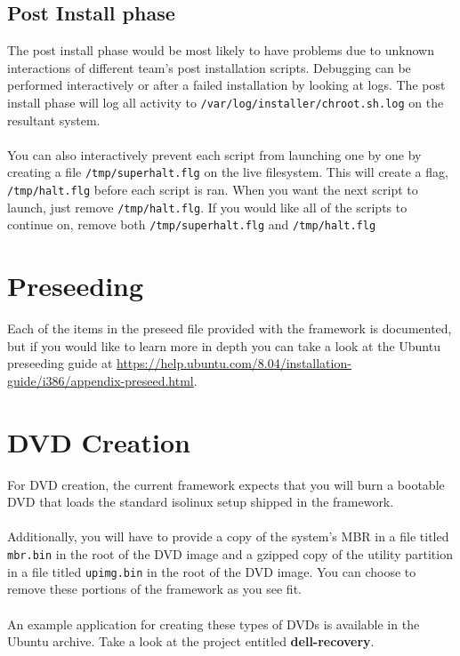 \documentclass[letterpaper,10pt,titlepage]{article}
\begin{document}
\subsection{Post Install phase}
The post install phase would be most likely to have problems due to unknown interactions of different team's post installation scripts.
Debugging can be performed interactively or after a failed installation by looking at logs.
The post install phase will log all activity to \texttt{/var/log/installer/chroot.sh.log} on the resultant system.
\\
\\
You can also interactively prevent each script from launching one by one by creating a file \texttt{/tmp/superhalt.flg} on the live filesystem.  This will create a flag, \texttt{/tmp/halt.flg} before each script is ran.  When you want the next script to launch, just remove \texttt{/tmp/halt.flg}.  If you would like all of the scripts to continue on, remove both \texttt{/tmp/superhalt.flg} and \texttt{/tmp/halt.flg}

\section{Preseeding}
Each of the items in the preseed file provided with the framework is documented, but if you would like to learn more in depth you can take a look at the Ubuntu preseeding guide at \url{https://help.ubuntu.com/8.04/installation-guide/i386/appendix-preseed.html}.

\section{DVD Creation}
For DVD creation, the current framework expects that you will burn a bootable DVD that loads the standard isolinux setup shipped in the framework.
\\
\\
Additionally, you will have to provide a copy of  the system's MBR in a file titled \texttt{mbr.bin} in the root of the DVD image and a gzipped copy of the utility partition in a file titled \texttt{upimg.bin} in the root of the DVD image.  You can choose to remove these portions of the framework as you see fit.
\\
\\
An example application for creating these types of DVDs is available in the Ubuntu archive.  Take a look at the project entitled \textbf{dell-recovery}.
\end{document}
